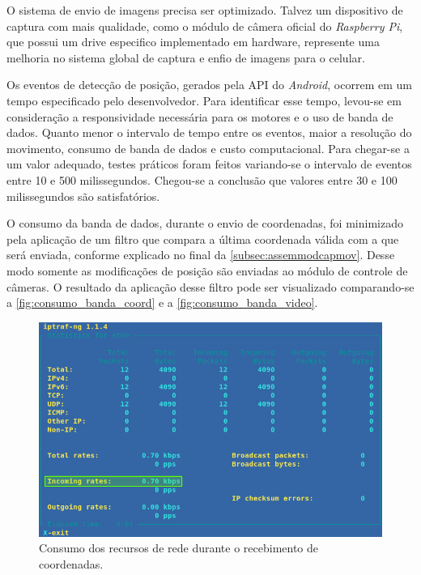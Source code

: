 O sistema de envio de imagens precisa ser optimizado. Talvez um dispositivo de captura com mais qualidade, como o módulo de câmera oficial do \textit{Raspberry Pi}, que possui um drive especifico implementado em hardware, represente uma melhoria no sistema global de captura e enfio de imagens para o celular.\par

Os eventos de detecção de posição, gerados pela API do \textit{Android}, ocorrem em um tempo especificado pelo desenvolvedor. Para identificar esse tempo, levou-se em consideração a responsividade necessária para os motores e o uso de banda de dados. Quanto menor o intervalo de tempo entre os eventos, maior a resolução do movimento,  consumo de banda de dados e custo computacional. Para chegar-se a um valor adequado, testes práticos foram feitos variando-se o intervalo de eventos entre 10 e 500 milissegundos. Chegou-se a conclusão que valores entre 30 e 100 milissegundos são satisfatórios.\par

O consumo da banda de dados, durante o envio de coordenadas, foi minimizado pela aplicação de um filtro que compara a última coordenada válida com a que será enviada, conforme explicado no final da \autoref{subsec:assemmodcapmov}. Desse modo somente as modificações de posição são enviadas ao módulo de controle de câmeras. O resultado da aplicação desse filtro pode ser visualizado comparando-se a \autoref{fig:consumo_banda_coord} e a \autoref{fig:consumo_banda_video}.\par

\begin{figure}[H]
	\centering
	\includegraphics[width=1\textwidth]{figuras/consumo_banda.jpg}
	\caption{Consumo dos recursos de rede durante o recebimento de coordenadas.}
	\label{fig:consumo_banda_coord}
\end{figure}

